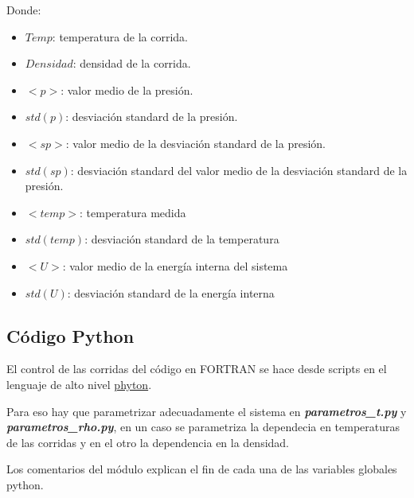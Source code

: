 Donde:

\begin{itemize}

\item $Temp$: temperatura de la corrida.      
\item $Densidad$: densidad de la corrida.       
\item $<p>$: valor medio de la presión.      
\item $std(p)$: desviación standard de la presión.       
\item $<sp>$: valor medio de la desviación standard de la presión.       
\item $std(sp)$: desviación standard del valor medio de la desviación standard de la presión.    
\item $<temp>$: temperatura medida      
\item $std(temp)$: desviación standard de la temperatura       
\item $<U>$: valor medio de la energía interna del sistema       
\item $std(U)$: desviación standard de la energía interna
\end{itemize}



\subsection{Código Python}

El control de las corridas del código en FORTRAN se hace desde scripts en el lenguaje
de alto nivel  \href{http://www.python.org/}{phyton}. 

Para eso hay que parametrizar adecuadamente el sistema en \textbf{\textit{parametros\_t.py}} y 
\textbf{\textit{parametros\_rho.py}}, en un caso se parametriza la dependecia en temperaturas
de las corridas y en el otro la dependencia en la densidad.
 
Los comentarios del módulo explican el fin de cada una de las variables globales python.

\begingroup
    \fontsize{8pt}{10pt}\selectfont

